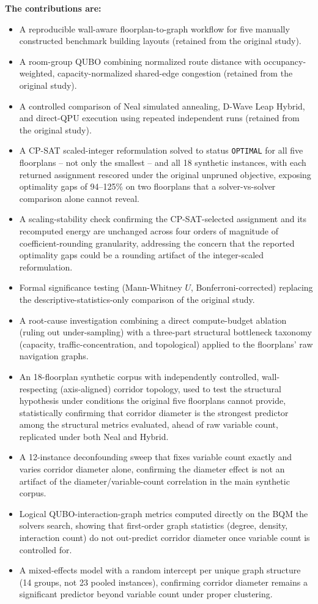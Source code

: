 \documentclass[11pt]{article}
\begin{document}
\textbf{The contributions are:}
\begin{itemize}[leftmargin=*]
\item A reproducible wall-aware floorplan-to-graph workflow for five manually constructed benchmark building layouts (retained from the original study).
\item A room-group QUBO combining normalized route distance with occupancy-weighted, capacity-normalized shared-edge congestion (retained from the original study).
\item A controlled comparison of Neal simulated annealing, D-Wave Leap Hybrid, and direct-QPU execution using repeated independent runs (retained from the original study).
\item A CP-SAT scaled-integer reformulation solved to status \texttt{OPTIMAL} for all five floorplans -- not only the smallest -- and all 18 synthetic instances, with each returned assignment rescored under the original unpruned objective, exposing optimality gaps of 94--125\% on two floorplans that a solver-vs-solver comparison alone cannot reveal.
\item A scaling-stability check confirming the CP-SAT-selected assignment and its recomputed energy are unchanged across four orders of magnitude of coefficient-rounding granularity, addressing the concern that the reported optimality gaps could be a rounding artifact of the integer-scaled reformulation.
\item Formal significance testing (Mann-Whitney $U$, Bonferroni-corrected) replacing the descriptive-statistics-only comparison of the original study.
\item A root-cause investigation combining a direct compute-budget ablation (ruling out under-sampling) with a three-part structural bottleneck taxonomy (capacity, traffic-concentration, and topological) applied to the floorplans' raw navigation graphs.
\item An 18-floorplan synthetic corpus with independently controlled, wall-respecting (axis-aligned) corridor topology, used to test the structural hypothesis under conditions the original five floorplans cannot provide, statistically confirming that corridor diameter is the strongest predictor among the structural metrics evaluated, ahead of raw variable count, replicated under both Neal and Hybrid.
\item A 12-instance deconfounding sweep that fixes variable count exactly and varies corridor diameter alone, confirming the diameter effect is not an artifact of the diameter/variable-count correlation in the main synthetic corpus.
\item Logical QUBO-interaction-graph metrics computed directly on the BQM the solvers search, showing that first-order graph statistics (degree, density, interaction count) do not out-predict corridor diameter once variable count is controlled for.
\item A mixed-effects model with a random intercept per unique graph structure (14 groups, not 23 pooled instances), confirming corridor diameter remains a significant predictor beyond variable count under proper clustering.
\end{itemize}
\end{document}
